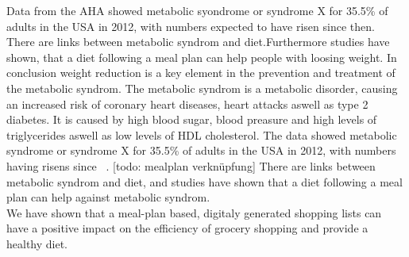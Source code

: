 Data from the AHA showed metabolic syondrome or syndrome X for 35.5\% of adults in the USA in 2012, with numbers expected to have risen since then. There are links between metabolic syndrom and diet.Furthermore studies have shown, that a diet following a meal plan can help people with loosing weight. In conclusion weight reduction is a key element in the prevention and treatment of the metabolic syndrom.
The metabolic syndrom is a metabolic disorder, causing an increased risk of coronary heart diseases, heart attacks aswell as type 2 diabetes. It is caused by high blood sugar, blood preasure and high levels of triglycerides aswell as low levels of HDL cholesterol. The data showed metabolic syndrome or syndrome X for 35.5\% of adults in the USA in 2012, with numbers having risens since ~\parencite{hirode2020trends}.
[todo: mealplan verknüpfung]
 There are links between metabolic syndrom and diet, and studies have shown that a diet following a meal plan can help against metabolic syndrom.\\


We have shown that a meal-plan based, digitaly generated shopping lists can have a positive impact on the efficiency of grocery shopping and provide a healthy diet. 
